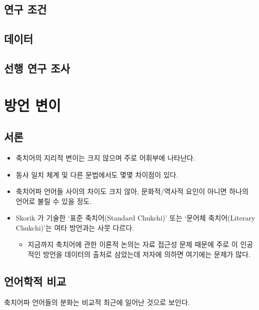 \subsection{연구 조건}
\omission
\subsection{데이터}
\omission
\subsection{선행 연구 조사}
\omission

\section{방언 변이}
\subsection{서론}
\begin{itemize}
\item 축치어의 지리적 변이는 크지 않으며 주로 어휘부에 나타난다. 
\item 동사 일치 체계 및 다른 문법에서도 몇몇 차이점이 있다. 
\item 축치어파 언어들 사이의 차이도 크지 않아, 문화적/역사적 요인이 아니면 하나의 언어로 불릴 수 있을 정도.
\item Skorik 가 기술한 ‘표준 축치어(Standard Chukchi)’ 또는 ‘문어체 축치어(Literary Chukchi)’는 여타 방언과는 사뭇 다르다. 
\begin{itemize}
\item 지금까지 축치어에 관한 이론적 논의는 자료 접근성 문제 때문에 주로 이 인공적인 방언을 데이터의 출처로 삼았는데 저자에 의하면 여기에는 문제가 많다.
\end{itemize}
\end{itemize}

\subsection{언어학적 비교}
축치어파 언어들의 분화는 비교적 최근에 일어난 것으로 보인다. 

